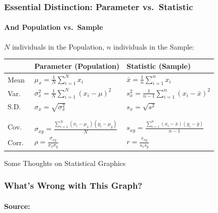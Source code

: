 \documentclass[handout]{beamer}
\begin{document}
\begin{frame}

\frametitle{Essential Distinction: Parameter vs.\ Statistic}
\framesubtitle{And Population vs.\ Sample}
$N$ individuals in the Population, $n$ individuals in the Sample:

\vspace{1em}
\small
\begin{tabular}{l|l|l}
	&\textbf{Parameter} (Population)&\textbf{Statistic} (Sample)\\
	\hline
	Mean&$\displaystyle\mu_x = \frac{1}{N} \sum_{i=1}^N x_i$& $\displaystyle\bar{x} = \frac{1}{n} \sum_{i=1}^n x_i$ \\
	Var.\ &$\displaystyle \sigma_x^2 = \frac{1}{N}\sum_{i=1}^N (x_i - \mu)^2$ &$\displaystyle s_x^2 = \frac{1}{n-1}\sum_{i=1}^n(x_i - \bar{x})^2$\\
	S.D.\ &$\sigma_x = \sqrt{\sigma_x^2}$ &$s_x = \sqrt{s^2}$ \\
	&&\\
	\hline
	&&\\
	\alert{Cov.\ }&\alert{$\displaystyle \sigma_{xy} = \frac{\sum_{i=1}^N(x_i - \mu_x)(y_i - \mu_y)}{N}$} &\alert{$\displaystyle s_{xy} = \frac{\sum_{i=1}^n(x_i - \bar{x})(y_i - \bar{y})}{n-1}$}\\
	\alert{Corr.\ } & \alert{$\displaystyle \rho = \frac{\sigma_{xy}}{\sigma_x \sigma_y}$}& \alert{$\displaystyle r = \frac{s_{xy}}{s_x s_y}$}
\end{tabular}

\end{frame}
\begin{frame}

\Huge \centering Some Thoughts on Statistical Graphics

\end{frame}
\begin{frame}
\frametitle{What's Wrong with This Graph?}
\framesubtitle{Source: \href{http://www.climatecentral.org/news/noaa-2012-was-warmest-and-second-most-extreme-year-on-record-15436}{}}
	\begin{figure}
\end{figure}
\end{frame}
\end{document}
